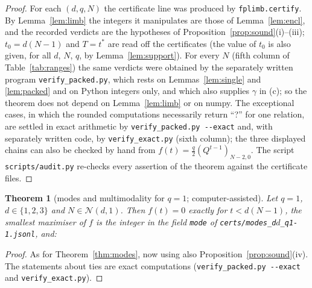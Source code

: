 \documentclass[11pt,a4paper]{article}
\newtheorem{theorem}{Theorem}
\theoremstyle{definition}
\theoremstyle{remark}
\begin{document}
\begin{proof}
For each $(d,q,N)$ the certificate line was produced by \texttt{fplimb.certify}. By Lemma~\ref{lem:limb} the integers it manipulates are those of Lemma~\ref{lem:encl}, and the recorded verdicts are the hypotheses of Proposition~\ref{prop:sound}(i)--(iii); $t_0=d(N-1)$ and $T=t^*$ are read off the certificates (the value of $t_0$ is also given, for all $d$, $N$, $q$, by Lemma~\ref{lem:support}). For every $N$ (fifth column of Table~\ref{tab:ranges}) the same verdicts were obtained by the separately written program \texttt{verify\_packed.py}, which rests on Lemmas~\ref{lem:single} and \ref{lem:packed} and on Python integers only, and which also supplies $\gamma$ in (c); so the theorem does not depend on Lemma~\ref{lem:limb} or on numpy. The exceptional cases, in which the rounded computations necessarily return ``?'' for one relation, are settled in exact arithmetic by \texttt{verify\_packed.py -{}-exact} and, with separately written code, by \texttt{verify\_exact.py} (sixth column); the three displayed chains can also be checked by hand from $f(t)=\frac q2(Q^{t-1})_{N-2,0}$. The script \texttt{scripts/audit.py} re-checks every assertion of the theorem against the certificate files.
\end{proof}

\begin{theorem}[modes and multimodality for $q=1$; computer-assisted]\label{thm:modesU}
Let $q=1$, $d\in\{1,2,3\}$ and $N\in\mathcal N(d,1)$. Then $f(t)=0$ exactly for $t<d(N-1)$, the smallest maximiser of $f$ is the integer in the field \texttt{mode} of \texttt{certs/modes\_d$d$\_q1-1.jsonl}, and:

\end{theorem}
\begin{proof}
As for Theorem~\ref{thm:modes}, now using also Proposition~\ref{prop:sound}(iv). The statements about ties are exact computations (\texttt{verify\_packed.py -{}-exact} and \texttt{verify\_exact.py}).
\end{proof}

\begin{table}[!htbp]\centering\small

\caption{$d=1$: selected certified modes. Columns 3--6 refer to $q=4/5$; here $\tau_N=N(N-1)$ exactly, and $t^*/\mathbb E T$, $t_{\rm cf}$ and the relative error are rounded values of certified enclosures (Section~\ref{sec:cf}).}\label{tab:m1}
\end{table}
\begin{table}[!htbp]\centering\small

\caption{$d=2$: selected certified modes (same conventions; $\tau_N$ rounded).}\label{tab:m2}
\end{table}
\begin{table}[!htbp]\centering\small

\caption{$d=3$: selected certified modes (same conventions).}\label{tab:m3}
\end{table}
\end{document}
